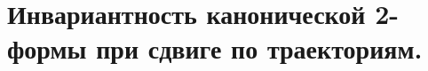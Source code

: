 \section{Инвариантность канонической 2-формы при сдвиге по траекториям.}\label{chasec20}



\newpage